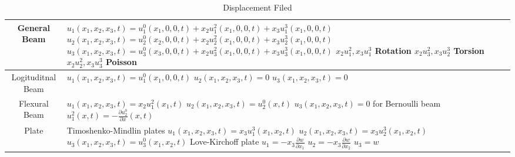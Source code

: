 \documentclass{article}
\begin{document}
\begin{table}[htbp]
    \centering
    \caption{Displacement Filed}
    \begin{tabular}{c|l}
    \hline
      General Beam &
      \makecell[l]{
      $u_{1}(x_{1},x_{2},x_{3},t)=u_{1}^{0}(x_{1},0,0,t)+x_{2}u_{1}^{2}(x_{1},0,0,t)+x_{3}u_{1}^{3}(x_{1},0,0,t)$\\
      $u_{2}(x_{1},x_{2},x_{3},t)=u_{2}^{0}(x_{2},0,0,t)+x_{2}u_{2}^{2}(x_{1},0,0,t)+x_{3}u_{2}^{3}(x_{1},0,0,t)$\\
      $u_{3}(x_{1},x_{2},x_{3},t)=u_{3}^{0}(x_{3},0,0,t)+x_{2}u_{3}^{2}(x_{1},0,0,t)+x_{3}u_{3}^{3}(x_{1},0,0,t)$\\
      $x_{2}u_1^2, x_{3}u_1^3$ Rotation \\
      $x_{2}u_3^2, x_{3}u_2^3$ Torsion \\
      $x_{2}u_2^2, x_{3}u_3^3$ Poisson \\
      } \\
      \hline
      Logituditnal Beam &
      \makecell[l]{
      $u_{1}(x_{1},x_{2},x_{3},t)=u_{1}^{0}(x_{1},0,0,t)$\\
      $u_{2}(x_{1},x_{2},x_{3},t)=0$\\
      $u_{3}(x_{1},x_{2},x_{3},t)=0$\\
      } \\
      \hline
      Flexural Beam &
      \makecell[l]{
      $u_{1}(x_{1},x_{2},x_{3},t)=x_{2}u_{1}^{2}(x_{1},t)$\\
      $u_{2}(x_{1},x_{2},x_{3},t)=u_{2}^{0}(x,t)$\\
      $u_{3}(x_{1},x_{2},x_{3},t)=0$\\
      for Bernoulli beam \\
      $u_{1}^{2}(x,t)=-\frac{\partial u_{2}^{0}}{\partial x}(x,t)$\\
      } \\
      \hline
      Plate &
      \makecell[l]{
      Timoshenko-Mindlin plates\\
      $u_{1}(x_{1},x_{2},x_{3},t)=x_{3}u_{1}^{3}(x_{1},x_{2},t)$\\
      $u_{2}(x_{1},x_{2},x_{3},t)=x_{3}u_{2}^{3}(x_{1},x_{2},t)$\\
      $u_{3}(x_{1},x_{2},x_{3},t)=u_{3}^{0}(x_{1},x_{2},t)$\\
      Love-Kirchoff plate\\
      $u_{1}=-x_{3}\frac{\partial w}{\partial x_{1}}$\\
      $u_{2}=-x_{3}\frac{\partial w}{\partial x_{2}}$\\
      $u_{3}=w$\\
      }\\
      \hline
    \end{tabular}
\end{table}
\end{document}
